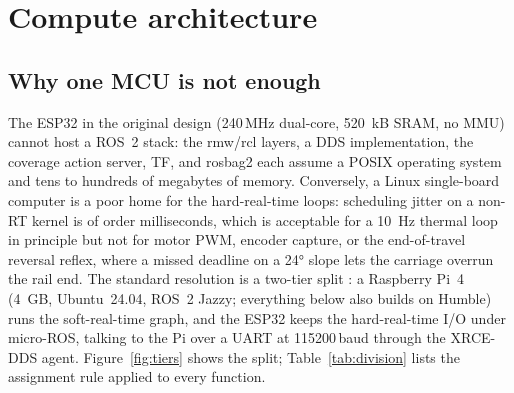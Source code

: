\documentclass[11pt,a4paper]{article}
\begin{document}
\section{Compute architecture}

\subsection{Why one MCU is not enough}
The ESP32 in the original design (240\,MHz dual-core, \SI{520}{\kilo B} SRAM, no MMU)
cannot host a ROS~2 stack: the rmw/rcl layers, a DDS implementation, the coverage
action server, TF, and rosbag2 each assume a POSIX operating system and tens to
hundreds of megabytes of memory. Conversely, a Linux single-board computer is a poor
home for the hard-real-time loops: scheduling jitter on a non-RT kernel is of order
milliseconds, which is acceptable for a \SI{10}{\hertz} thermal loop in principle but
not for motor PWM, encoder capture, or the end-of-travel reversal reflex, where a
missed deadline on a \ang{24} slope lets the carriage overrun the rail end. The
standard resolution is a two-tier split \cite{belsare2023microros}: a Raspberry Pi~4
(\SI{4}{\giga B}, Ubuntu~24.04, ROS~2 Jazzy; everything below also builds on Humble)
runs the soft-real-time graph, and the ESP32 keeps the hard-real-time I/O under
micro-ROS, talking to the Pi over a UART at \num{115200}\,baud through the XRCE-DDS
agent. Figure~\ref{fig:tiers} shows the split; Table~\ref{tab:division} lists the
assignment rule applied to every function.
\end{document}
